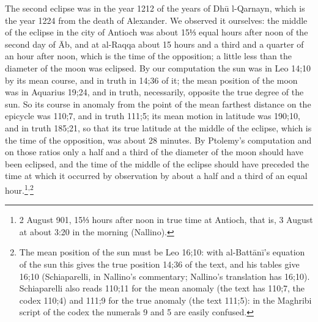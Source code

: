 \documentclass[11pt]{article}
\newcommand{\ArPage}[1]{\marginpar{\footnotesize\color{gray}Ar.\,p.\,#1}}
\begin{document}
\par \ArPage{87}The second eclipse was in the year 1212 of the years of Dhū l-Qarnayn, which is the year 1224 from the death of Alexander. We observed it ourselves: the middle of the eclipse in the city of Antioch was about 15⅓ equal hours after noon of the second day of Āb, and at al-Raqqa about 15 hours and a third and a quarter of an hour after noon, which is the time of the opposition; a little less than the diameter of the moon was eclipsed. By our computation the sun was in Leo 14;10 by its mean course, and in truth in 14;36 of it; the mean position of the moon was in Aquarius 19;24, and in truth, necessarily, opposite the true degree of the sun. So its course in anomaly from the point of the mean farthest distance on the epicycle was 110;7, and in truth 111;5; its mean motion in latitude was 190;10, and in truth 185;21, so that its true latitude at the middle of the eclipse, which is the time of the opposition, was about 28 minutes. By Ptolemy's computation and on those ratios only a half and a third of the diameter of the moon should have been eclipsed, and the time of the middle of the eclipse should have preceded the time at which it occurred by observation by about a half and a third of an equal hour.\footnote{2 August 901, 15⅓ hours after noon in true time at Antioch, that is, 3 August at about 3:20 in the morning (Nallino).}\textsuperscript{,}\footnote{The mean position of the sun must be Leo 16;10: with al-Battānī's equation of the sun this gives the true position 14;36 of the text, and his tables give 16;10 (Schiaparelli, in Nallino's commentary; Nallino's translation has 16;10). Schiaparelli also reads 110;11 for the mean anomaly (the text has 110;7, the codex 110;4) and 111;9 for the true anomaly (the text 111;5): in the Maghribi script of the codex the numerals 9 and 5 are easily confused.}\par
\end{document}
